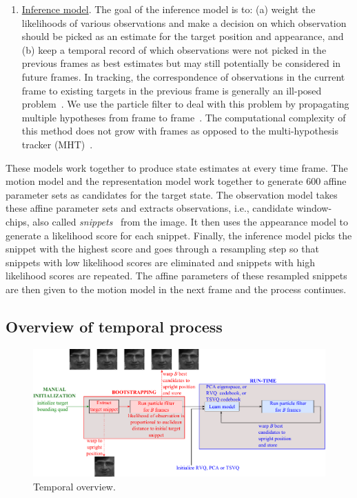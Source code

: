 \begin{enumerate}
\item \underline{Inference model}.  The goal of the inference model is to: (a) weight the likelihoods of various observations and make a decision on which observation should be picked as an estimate for the target position and appearance, and (b) keep a temporal record of which observations were not picked in the previous frames as best estimates but may still potentially be considered in future frames.  In tracking, the correspondence of observations in the current frame to existing targets in the previous frame is generally an ill-posed problem~\cite{2005_CNF_TRK_Yang}.  We use the particle filter to deal with this problem by propagating multiple hypotheses from frame to frame~\cite{1998_JNL_Condensation_IsardBlake}.  The computational complexity of this method does not grow with frames as opposed to the multi-hypothesis tracker (MHT)~\cite{1993_JNL_SURVEYcorresp_Cox}.
\end{enumerate}

These models work together to produce state estimates at every time frame.  The motion model and the representation model work together to generate 600 affine parameter sets as candidates for the target state.  The observation model takes these affine parameter sets and extracts observations, i.e., candidate window-chips, also called \emph{snippets}~\cite{2007_JNL_IDDM_Barnes} from the image.  It then uses the appearance model to generate a likelihood score for each snippet.  Finally, the inference model picks the snippet with the highest score and goes through a resampling step so that snippets with low likelihood scores are eliminated and snippets with high likelihood scores are repeated.  The affine parameters of these resampled snippets are then given to the motion model in the next frame and the process continues.

\subsection{Overview of temporal process}
								\begin{figure}[t]
								\centering
								\includegraphics[width=1.1\textwidth]{thesis/PhD_experimentalTemporalOverview.pdf}
								\caption{Temporal overview.}
								\label{fig:temporal_overview}
								\end{figure}

